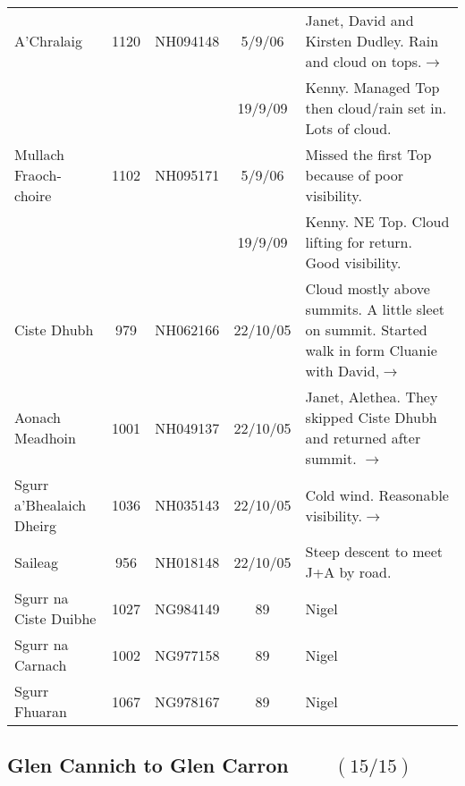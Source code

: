 \documentclass[10pt,a4paper]{article}
\begin{document}
\begin{tabular}{lcccp{6cm}}
A'Chralaig & 1120 & NH094148&5/9/06&Janet, David and Kirsten Dudley. Rain and cloud on tops.$\rightarrow$   \\
&&&19/9/09&Kenny. Managed Top then cloud/rain set in. Lots of cloud.\\
Mullach Fraoch-choire  & 1102 & NH095171&5/9/06& Missed the first Top because of poor visibility. \\
&&&19/9/09&Kenny. NE Top. Cloud lifting for return. Good visibility.\\
Ciste Dhubh & 979 & NH062166&22/10/05&Cloud mostly above summits.
A little
sleet on summit. Started walk in form Cluanie with David,$\rightarrow$ \\
Aonach Meadhoin & 1001 & NH049137&22/10/05&Janet, Alethea. They skipped Ciste Dhubh and returned after summit.
$\rightarrow$ \\
Sgurr a'Bhealaich Dheirg  & 1036 & NH035143&22/10/05&Cold wind. Reasonable visibility.$\rightarrow$   \\
Saileag & 956  & NH018148&22/10/05& Steep descent to meet J+A by road.\\
Sgurr na Ciste Duibhe & 1027 & NG984149&89&Nigel \\
Sgurr na Carnach  & 1002  & NG977158&89&Nigel \\
Sgurr Fhuaran  & 1067  & NG978167&89&Nigel  \\
\end{tabular}


\subsection*{Glen Cannich to Glen Carron $\qquad (15/15)$}
\end{document}
